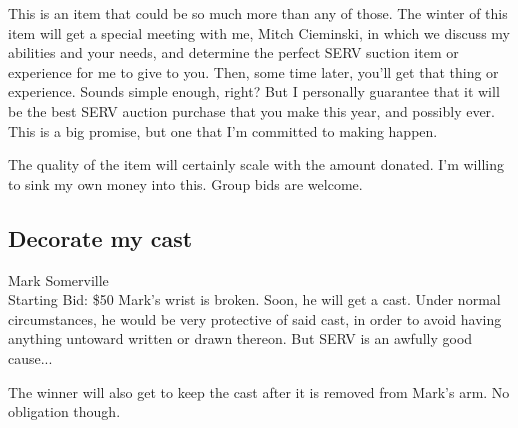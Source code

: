 \documentclass[11pt]{article}
\begin{document}
This is an item that could be so much more than any of those. The winter of this item will get a special meeting with me, Mitch Cieminski, in which we discuss my abilities and your needs, and determine the perfect SERV suction item or experience for me to give to you. Then, some time later, you'll get that thing or experience. Sounds simple enough, right? But I personally guarantee that it will be the best SERV auction purchase that you make this year, and possibly ever. This is a big promise, but one that I'm committed to making happen.

The quality of the item will certainly scale with the amount donated. I'm willing to sink my own money into this. Group bids are welcome.
\subsection{Decorate my cast}
Mark Somerville
\\
Starting Bid: \$50
\newline
Mark's wrist is broken.  Soon, he will get a cast.  Under normal circumstances, he would be very protective of said cast, in order to avoid having anything untoward written or drawn thereon.  But SERV is an awfully good cause... 

The winner will also get to keep the cast after it is removed from Mark's arm. No obligation though.
\end{document}
